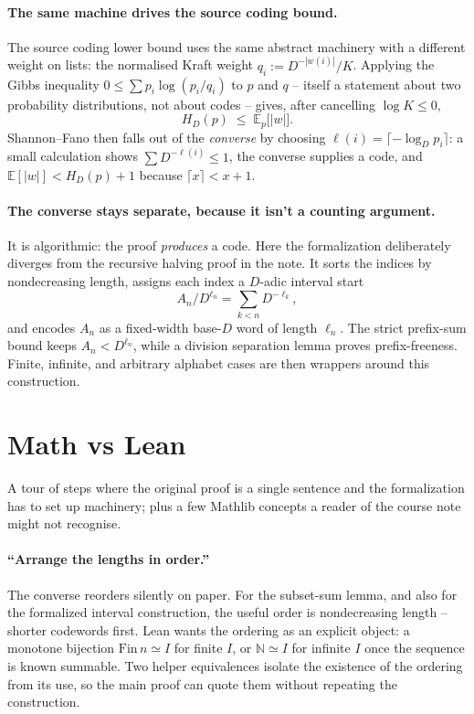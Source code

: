 \documentclass[11pt]{article}
\begin{document}
\paragraph{The same machine drives the source coding bound.} The source
coding lower bound uses the same abstract machinery with a different weight
on lists: the normalised Kraft weight $q_i := D^{-|w(i)|} / K$. Applying
the Gibbs inequality $0 \le \sum p_i \log(p_i / q_i)$ to $p$ and $q$ --
itself a statement about two probability distributions, not about codes --
gives, after cancelling $\log K \le 0$,
\[
  H_D(p) \;\le\; \mathbb{E}_p \bigl[|w|\bigr].
\]
Shannon--Fano then falls out of the \emph{converse} by choosing
$\ell(i) = \lceil -\log_D p_i \rceil$: a small calculation shows
$\sum D^{-\ell(i)} \le 1$, the converse supplies a code, and
$\mathbb{E}[|w|] < H_D(p) + 1$ because $\lceil x \rceil < x + 1$.

\paragraph{The converse stays separate, because it isn't a counting argument.}
It is algorithmic: the proof \emph{produces} a code. Here the
formalization deliberately diverges from the recursive halving proof in
the note. It sorts the indices by nondecreasing length, assigns each index
a $D$-adic interval start
\[
  A_n/D^{\ell_n}
  = \sum_{k<n} D^{-\ell_k},
\]
and encodes $A_n$ as a fixed-width base-$D$ word of length $\ell_n$.
The strict prefix-sum bound keeps $A_n < D^{\ell_n}$, while a division
separation lemma proves prefix-freeness. Finite, infinite, and arbitrary
alphabet cases are then wrappers around this construction.

\section{Math vs Lean}
\label{sec:mathvslean}

A tour of steps where the original proof is a single sentence and the
formalization has to set up machinery; plus a few \textsf{Mathlib}
concepts a reader of the course note might not recognise.

\paragraph{``Arrange the lengths in order.''} The converse reorders
silently on paper. For the subset-sum lemma, and also for the formalized
interval construction, the useful order is nondecreasing length -- shorter
codewords first. Lean wants the ordering as an explicit object: a monotone
bijection
$\mathrm{Fin}\,n \simeq I$ for finite $I$, or $\mathbb{N} \simeq I$ for
infinite $I$ once the sequence is known summable. Two helper equivalences
isolate the existence of the ordering from its use, so the main proof can
quote them without repeating the construction.
\end{document}
